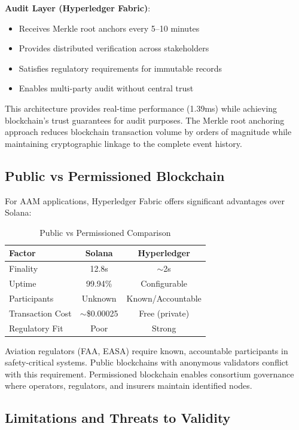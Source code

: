 \documentclass[conference]{IEEEtran}
\begin{document}
\textbf{Audit Layer (Hyperledger Fabric)}:
\begin{itemize}
\item Receives Merkle root anchors every 5--10 minutes
\item Provides distributed verification across stakeholders
\item Satisfies regulatory requirements for immutable records
\item Enables multi-party audit without central trust
\end{itemize}

This architecture provides real-time performance (1.39ms) while achieving blockchain's trust guarantees for audit purposes. The Merkle root anchoring approach reduces blockchain transaction volume by orders of magnitude while maintaining cryptographic linkage to the complete event history.

\subsection{Public vs Permissioned Blockchain}

For AAM applications, Hyperledger Fabric offers significant advantages over Solana:

\begin{table}[htbp]
\caption{Public vs Permissioned Comparison}
\label{tab:public_permissioned}
\centering
\begin{tabular}{lcc}
\toprule
\textbf{Factor} & \textbf{Solana} & \textbf{Hyperledger} \\
\midrule
Finality & 12.8s & $\sim$2s \\
Uptime & 99.94\% & Configurable \\
Participants & Unknown & Known/Accountable \\
Transaction Cost & $\sim$\$0.00025 & Free (private) \\
Regulatory Fit & Poor & Strong \\
\bottomrule
\end{tabular}
\end{table}

Aviation regulators (FAA, EASA) require known, accountable participants in safety-critical systems. Public blockchains with anonymous validators conflict with this requirement. Permissioned blockchain enables consortium governance where operators, regulators, and insurers maintain identified nodes.

\subsection{Limitations and Threats to Validity}
\end{document}

